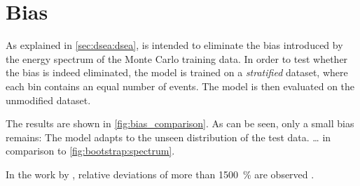 \section{Bias}
As explained in \autoref{sec:dsea:dsea},
\dsea{} is intended to eliminate the bias introduced by the energy spectrum of the Monte Carlo training data.
%
In order to test
whether the bias is indeed eliminated,
the model is trained on a \emph{stratified} dataset,
    where each bin contains an equal number of events.
The model is then evaluated on the unmodified dataset.

The results are shown in \autoref{fig:bias_comparison}.
As can be seen,
only a small bias remains:
The model adapts to the unseen distribution of the test data.
… in comparison to \autoref{fig:bootstrap:spectrum}.

In the work by \citeauthor{dsea_samuel},
relative deviations of more than \SI{1500}{\percent} are observed \cite{dsea_samuel}.


